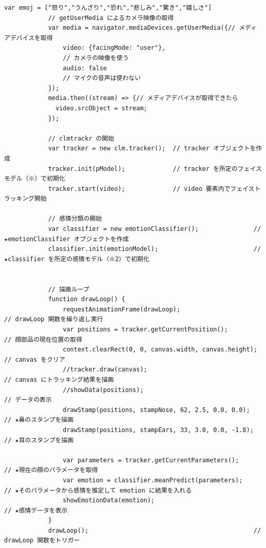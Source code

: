 \documentclass[mingoth,11pt,a4j,uplatex]{jsarticle}
\begin{document}
\begin{lstlisting}[caption=07-05.html]
            var emoj = ["怒り","うんざり","恐れ","悲しみ","驚き","嬉しさ"]
            // getUserMedia によるカメラ映像の取得
            var media = navigator.mediaDevices.getUserMedia({// メディアデバイスを取得
                video: {facingMode: "user"},                          
                // カメラの映像を使う
                audio: false                                          
                // マイクの音声は使わない
            });
            media.then((stream) => {// メディアデバイスが取得できたら
              video.srcObject = stream;
            });
            
            // clmtrackr の開始
            var tracker = new clm.tracker();  // tracker オブジェクトを作成
            tracker.init(pModel);             // tracker を所定のフェイスモデル（※）で初期化
            tracker.start(video);             // video 要素内でフェイストラッキング開始

            // 感情分類の開始
            var classifier = new emotionClassifier();               // ★emotionClassifier オブジェクトを作成
            classifier.init(emotionModel);                          // ★classifier を所定の感情モデル（※2）で初期化

            
            // 描画ループ
            function drawLoop() {
                requestAnimationFrame(drawLoop);                      // drawLoop 関数を繰り返し実行
                var positions = tracker.getCurrentPosition();         // 顔部品の現在位置の取得
                context.clearRect(0, 0, canvas.width, canvas.height); // canvas をクリア
                //tracker.draw(canvas);                                 // canvas にトラッキング結果を描画
                //showData(positions);                                  // データの表示
                drawStamp(positions, stampNose, 62, 2.5, 0.0, 0.0);   // ★鼻のスタンプを描画
                drawStamp(positions, stampEars, 33, 3.0, 0.0, -1.8);  // ★耳のスタンプを描画

                var parameters = tracker.getCurrentParameters();      // ★現在の顔のパラメータを取得
                var emotion = classifier.meanPredict(parameters);     // ★そのパラメータから感情を推定して emotion に結果を入れる
                showEmotionData(emotion);                             // ★感情データを表示
            }
            drawLoop();                                             // drawLoop 関数をトリガー
            

\end{lstlisting}
\end{document}

